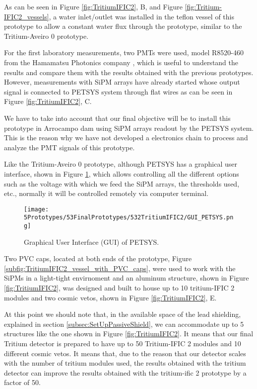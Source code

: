 As can be seen in Figure \ref{fig:TritiumIFIC2}, B, and Figure \ref{fig:Tritium-IFIC2_vessels}, a water inlet/outlet was installed in the teflon vessel of this prototype to allow a constant water flux through the prototype, similar to the Tritium-Aveiro 0 prototype.

For the first laboratory measurements, two PMTs were used, model R8520-460 from the Hamamatsu Photonics company \cite{DataSheetPMTs}, which is useful to understand the results and compare them with the results obtained with the previous prototypes. However, measurements with SiPM arrays have already started whose output signal is connected to PETSYS system through flat wires as can be seen in Figure \ref{fig:TritiumIFIC2}, C.

We have to take into account that our final objective will be to install this prototype in Arrocampo dam using SiPM arrays readout by the PETSYS system. This is the reason why we have not developed a electronics chain to process and analyze the PMT signals of this prototype.

Like the Tritium-Aveiro 0 prototype, although PETSYS has a graphical user interface, shown in Figure \ref{fig:GUI_PETSYS}, which allows controlling all the different options such as the voltage with which we feed the SiPM arrays, the thresholds used, etc., normally it will be controlled remotely via computer terminal. 

\begin{figure}[h]
\centering
\texttt{[image: 5Prototypes/53FinalPrototypes/532TritiumIFIC2/GUI\_PETSYS.png]}
\caption{Graphical User Interface (GUI) of PETSYS.\label{fig:GUI_PETSYS}}
\end{figure}

Two PVC caps, located at both ends of the prototype, Figure \ref{subfig:TritiumIFIC2_vessel_with_PVC_caps}, were used to work with the SiPMs in a light-tight envirnoment and an aluminum structure, shown in Figure \ref{fig:TritiumIFIC2}, was designed and built to house up to 10 tritium-IFIC 2 modules and two cosmic vetos, shown in Figure \ref{fig:TritiumIFIC2}, E.

At this point we should note that, in the available space of the lead shielding, explained in section \ref{subsec:SetUpPassiveShield}, we can accommodate up to 5 structures like the one shown in Figure \ref{fig:TritiumIFIC2}. It means that our final Tritium detector is prepared to have up to 50 Tritium-IFIC 2 modules and 10 different cosmic vetos. It means that, due to the reason that our detector scales with the number of tritium modules used, the results obtained with the tritium detector can improve the results obtained with the tritium-ific 2 prototype by a factor of 50.

